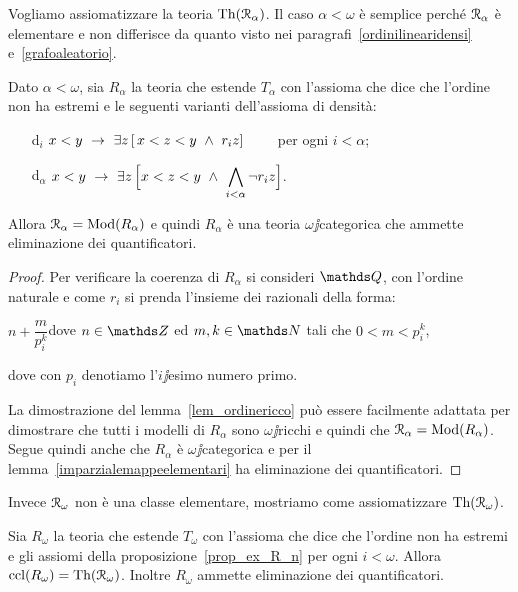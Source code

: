 Vogliamo assiomatizzare la teoria $\textrm{Th}(\EuScript R_\alpha)$. Il caso $\alpha<\omega$ \`e semplice perch\'e $\EuScript R_\alpha$ \`e elementare e non differisce da quanto visto nei paragrafi~\ref{ordinilinearidensi} e~\ref{grafoaleatorio}.

\begin{proposition}\label{prop_ex_R_n}
Dato $\alpha<\omega$, sia $R_\alpha$ la teoria che  estende $T_\alpha$ con l'assioma che dice che l'ordine non ha estremi e le seguenti varianti dell'assioma di densit\`a:
\begin{itemize}
\item[d$_i$] $x<y\ \imp\ \E z\,[\,x<z<y\ \wedge\ r_iz]$ \ \ \ \ per ogni $i<\alpha$;
\item[d$_\alpha$] $\displaystyle x<y\ \rightarrow\ \exists z\,\Big[ x<z<y\ \wedge\ \bigwedge_{i<\alpha} \neg r_iz\Big]$.
\end{itemize}
Allora $\EuScript R_\alpha=\mathop\textrm{Mod}(R_\alpha)$ e quindi $R_\alpha$ \`e una teoria $\omega\jj$categorica che ammette eliminazione dei quantificatori.
\end{proposition}


\begin{proof}
Per verificare la coerenza di $R_\alpha$ si consideri $\QQ$, con l'ordine naturale e come $r_i$ si prenda l'insieme dei razionali della forma: 

\hfil $n+\dfrac{m}{p_i^k}$\hfil dove $n\in\ZZ$ ed $m,k\in\NN$ tali che $0<m<p^k_i$,

dove con $p_i$ denotiamo l'$i\jj$esimo numero primo. 

La dimostrazione del lemma~\ref{lem_ordinericco} pu\`o essere facilmente adattata per dimostrare che tutti i modelli di $R_\alpha$ sono $\omega\jj$ricchi e quindi che $\EuScript R_\alpha=\mathop\textrm{Mod}(R_\alpha)$. Segue quindi anche che $R_\alpha$ \`e $\omega\jj$categorica e per il lemma~\ref{imparzialemappeelementari} ha eliminazione dei quantificatori.
\end{proof}

Invece $\EuScript R_\omega$ non  \`e una classe elementare, mostriamo come assiomatizzare $\textrm{Th}(\EuScript R_\omega)$. 

\begin{proposition}\label{prop_ex_R_omega}
Sia $R_\omega$ la teoria che  estende $T_\omega$ con l'assioma che dice che l'ordine non ha estremi e gli assiomi  della proposizione~\ref{prop_ex_R_n} per ogni $i<\omega$. Allora ${\rm ccl}(R_\omega)=\textrm{Th}(\EuScript R_\omega)$. Inoltre $R_\omega$ ammette eliminazione dei quantificatori.
\end{proposition}

